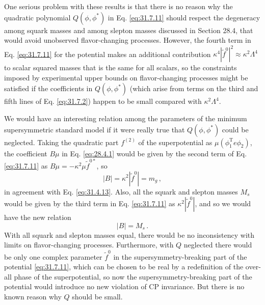 One serious problem with these results is that there is no reason why the
quadratic polynomial \(Q(\phi,\phi^*)\) in Eq. \eqref{eq:31.7.11} should
respect the degeneracy among squark masses and among slepton masses
discussed in Section 28.4, that would avoid unobserved flavor-changing
processes. However, the fourth term in Eq. \eqref{eq:31.7.11} for the
potential makes an additional contribution
\(\kappa^4|\widetilde f^0|^2\approx\kappa^2\Lambda^4\) to scalar squared
masses that is the same for all scalars, so the constraints imposed by
experimental upper bounds on flavor-changing processes might be satisfied
if the coefficients in \(Q(\phi,\phi^*)\) (which arise from terms on the
third and fifth lines of Eq. \eqref{eq:31.7.2}) happen to be small compared
with \(\kappa^2\Lambda^4\).

We would have an interesting relation among the parameters of the minimum
supersymmetric standard model if it were really true that \(Q(\phi,\phi^*)\)
could be neglected. Taking the quadratic part \(f^{(2)}\) of the
superpotential as \(\mu(\phi_1^{\mathrm T}e\phi_2)\), the coefficient
\(B\mu\) in Eq. \eqref{eq:28.4.1} would be given by the second term of
Eq. \eqref{eq:31.7.11} as
\(B\mu=-\kappa^2\mu\widetilde f^{0*}\), so
\[
  |B|=\kappa^2|\widetilde f^0|=m_g\,,
\]
in agreement with Eq. \eqref{eq:31.4.13}. Also, all the squark and slepton
masses \(M_s\) would be given by the third term in
Eq. \eqref{eq:31.7.11} as \(\kappa^2|\widetilde f^0|\), and so we would have
the new relation
\begin{equation}
  |B|=M_s\,.
  \tag{31.7.12}\label{eq:31.7.12}
\end{equation}
With all squark and slepton masses equal, there would be no inconsistency
with limits on flavor-changing processes. Furthermore, with \(Q\) neglected
there would be only one complex parameter \(\widetilde f^0\) in the
supersymmetry-breaking part of the potential \eqref{eq:31.7.11}, which can
be chosen to be real by a redefinition of the over-all phase of the
superpotential, so now the supersymmetry-breaking part of the potential
would introduce no new violation of CP invariance. But there is no known
reason why \(Q\) should be small.

